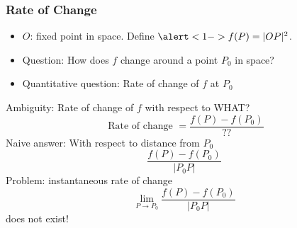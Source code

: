 \begin{frame}
\frametitle{Rate of Change}
\begin{itemize}
\item $O$: fixed point in space. Define $\alert<1->{f(P) = |OP|^2}$.
\item<2-> Question: How does $f$ change around a point $P_0$ in space? 
\item<4->\alert<1->{Quantitative} question: \pause
  \textcolor[rgb]{0.98,0.00,0.00}{Rate of change} of $f$ at $P_0$


\end{itemize}

  \pause Ambiguity: \pause Rate of change of $f$ with respect to WHAT?
  $$\text{ Rate of change } = \frac{f(P) - f(P_0)}{??}$$
  \pause Naive answer: \pause With respect to
  \textcolor[rgb]{0.00,0.00,0.00}{distance} from $P_0$
  $$\frac{f(P) - f(P_0)}{|P_0P|}$$
  \pause Problem: \pause
  \textcolor[rgb]{0.98,0.00,0.00}{instantaneous rate of change}
  $$\lim_{P\to P_0} \frac{f(P)-f(P_0)}{|P_0P|}$$
  does not exist!
\end{frame}